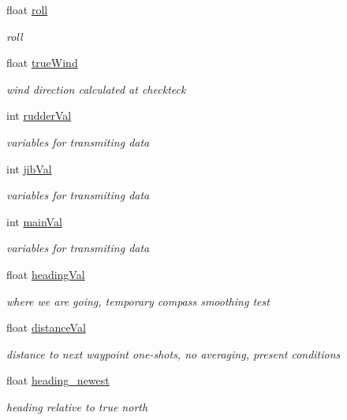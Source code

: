 \begin{DoxyCompactItemize}
float \hyperlink{group__group1_ga26fd84d522945b6038221d9e38c7cc39}{roll}
\begin{DoxyCompactList}\small\item\em roll \end{DoxyCompactList}\item 
float \hyperlink{group__group1_gaea221e98c9a7c4e63325dc52ab83c14d}{true\-Wind}
\begin{DoxyCompactList}\small\item\em wind direction calculated at checkteck \end{DoxyCompactList}\item 
int \hyperlink{group__group1_ga8b212bdc5d94214c0e3803a696f2f676}{rudder\-Val}
\begin{DoxyCompactList}\small\item\em variables for transmiting data \end{DoxyCompactList}\item 
int \hyperlink{group__group1_ga1fee0a7eb4ae243dcc5afe20f508990e}{jib\-Val}
\begin{DoxyCompactList}\small\item\em variables for transmiting data \end{DoxyCompactList}\item 
int \hyperlink{group__group1_ga3c5dac52b53dc3642a843a7d6a9266ca}{main\-Val}
\begin{DoxyCompactList}\small\item\em variables for transmiting data \end{DoxyCompactList}\item 
float \hyperlink{group__group1_ga8d6cfa64e358c393d2d13c5a9803e052}{heading\-Val}
\begin{DoxyCompactList}\small\item\em where we are going, temporary compass smoothing test \end{DoxyCompactList}\item 
float \hyperlink{group__group1_ga90176c4024ce3ce161b5feda285f97c5}{distance\-Val}
\begin{DoxyCompactList}\small\item\em distance to next waypoint one-\/shots, no averaging, present conditions \end{DoxyCompactList}\item 
float \hyperlink{group__group1_ga3c596663ba52aec96df1f504772914be}{heading\-\_\-newest}
\begin{DoxyCompactList}\small\item\em heading relative to true north \end{DoxyCompactList}\item 

\end{DoxyCompactItemize}
